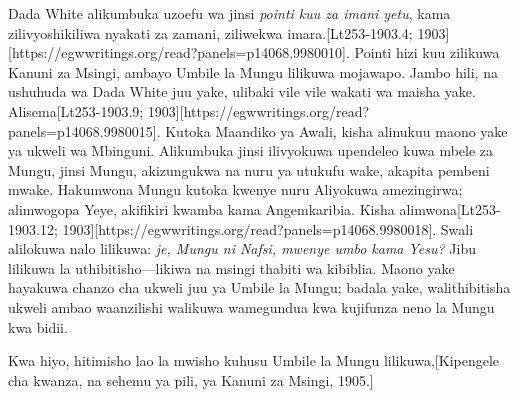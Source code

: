 Dada White alikumbuka uzoefu wa jinsi \textit{pointi kuu za imani yetu}, kama zilivyoshikiliwa nyakati za zamani, ziliwekwa imara.[Lt253-1903.4; 1903][https://egwwritings.org/read?panels=p14068.9980010]. Pointi hizi kuu zilikuwa Kanuni za Msingi, ambayo Umbile la Mungu lilikuwa mojawapo. Jambo hili, na ushuhuda wa Dada White juu yake, ulibaki vile vile wakati wa maisha yake. Alisema[Lt253-1903.9; 1903][https://egwwritings.org/read?panels=p14068.9980015]. Kutoka Maandiko ya Awali, kisha alinukuu maono yake ya ukweli wa Mbinguni. Alikumbuka jinsi ilivyokuwa upendeleo kuwa mbele za Mungu, jinsi Mungu, akizungukwa na nuru ya utukufu wake, akapita pembeni mwake. Hakumwona Mungu kutoka kwenye nuru Aliyokuwa amezingirwa; alimwogopa Yeye, akifikiri kwamba kama Angemkaribia. Kisha alimwona[Lt253-1903.12; 1903][https://egwwritings.org/read?panels=p14068.9980018]. Swali alilokuwa nalo lilikuwa: \textit{je, Mungu ni Nafsi, mwenye umbo kama Yesu?} Jibu lilikuwa la uthibitisho—likiwa na msingi thabiti wa kibiblia. Maono yake hayakuwa chanzo cha ukweli juu ya Umbile la Mungu; badala yake, walithibitisha ukweli ambao waanzilishi walikuwa wamegundua kwa kujifunza neno la Mungu kwa bidii.


Kwa hiyo, hitimisho lao la mwisho kuhusu Umbile la Mungu lilikuwa,[Kipengele cha kwanza, na sehemu ya pili, ya Kanuni za Msingi, 1905.]


